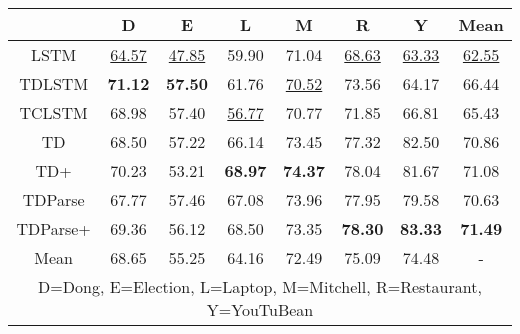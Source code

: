 
\begin{tabular}{|c|c|c|c|c|c|c|c|}
  \hline
  &   D &  E &  L &  M &  R &  Y &   Mean \\
 \hline
LSTM &  \underline{64.57} &     \underline{47.85} &   59.90 &     71.04 &       \underline{68.63} &      \underline{63.33} &  \underline{62.55} \\
 \hline
TDLSTM &  \textbf{71.12} &     \textbf{57.50} &   61.76 &     \underline{70.52} &       73.56 &      64.17 &  66.44 \\
  \hline
TCLSTM &  68.98 &     57.40 &   \underline{56.77} &     70.77 &       71.85 &      66.81 &  65.43 \\
   \hline
TD &  68.50 &     57.22 &   66.14 &     73.45 &       77.32 &      82.50 &  70.86 \\
   \hline
TD+ &  70.23 &     53.21 &   \textbf{68.97} &     \textbf{74.37} &       78.04 &      81.67 &  71.08 \\
    \hline
TDParse &  67.77 &     57.46 &   67.08 &     73.96 &       77.95 &      79.58 &  70.63 \\
    \hline
TDParse+ &  69.36 &     56.12 &   68.50 &     73.35 &       \textbf{78.30} &      \textbf{83.33} &  \textbf{71.49} \\
\hline
Mean &  68.65 &     55.25 &   64.16 &     72.49 &       75.09 &      74.48 &  - \\
\hline
\multicolumn{8}{|p{11.5cm}|}{\centering D=Dong, E=Election, L=Laptop, M=Mitchell, R=Restaurant, Y=YouTuBean}\\
\hline
\end{tabular}